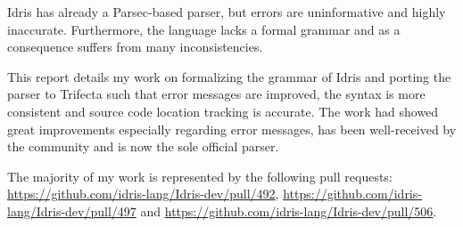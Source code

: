 Idris has already a Parsec-based parser, but errors are uninformative and highly inaccurate. Furthermore, the language lacks a formal grammar
and as a consequence suffers from many inconsistencies.

This report details my work on formalizing the grammar of Idris and porting the parser to Trifecta such that error messages are improved,
the syntax is more consistent and source code location tracking is accurate.
The work had showed great improvements especially regarding error messages, has been well-received
by the community and is now the sole official parser.

The majority of my work is represented by the following pull requests: \url{https://github.com/idris-lang/Idris-dev/pull/492},
\url{https://github.com/idris-lang/Idris-dev/pull/497} and \url{https://github.com/idris-lang/Idris-dev/pull/506}.
